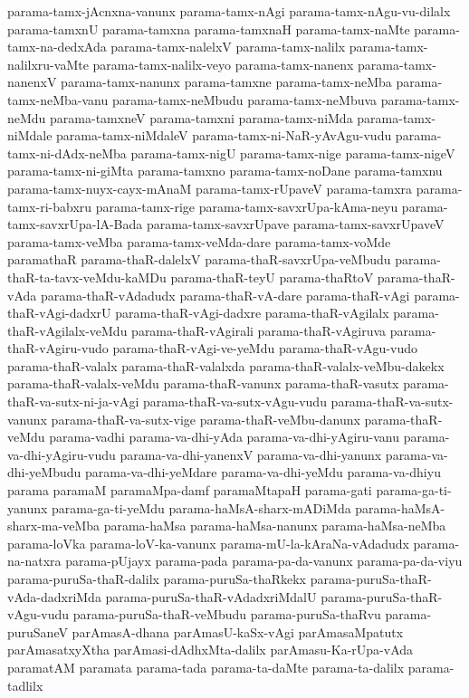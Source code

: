 {parama-tamx-jAcnxna-vanunx
parama-tamx-nAgi
parama-tamx-nAgu-vu-dilalx
parama-tamxnU
parama-tamxna
parama-tamxnaH
parama-tamx-naMte
parama-tamx-na-dedxAda
parama-tamx-nalelxV
parama-tamx-nalilx
parama-tamx-nalilxru-vaMte
parama-tamx-nalilx-veyo
parama-tamx-nanenx
parama-tamx-nanenxV
parama-tamx-nanunx
parama-tamxne
parama-tamx-neMba
parama-tamx-neMba-vanu
parama-tamx-neMbudu
parama-tamx-neMbuva
parama-tamx-neMdu
parama-tamxneV
parama-tamxni
parama-tamx-niMda
parama-tamx-niMdale
parama-tamx-niMdaleV
parama-tamx-ni-NaR-yAvAgu-vudu
parama-tamx-ni-dAdx-neMba
parama-tamx-nigU
parama-tamx-nige
parama-tamx-nigeV
parama-tamx-ni-giMta
parama-tamxno
parama-tamx-noDane
parama-tamxnu
parama-tamx-nuyx-cayx-mAnaM
parama-tamx-rUpaveV
parama-tamxra
parama-tamx-ri-babxru
parama-tamx-rige
parama-tamx-savxrUpa-kAma-neyu
parama-tamx-savxrUpa-lA-Bada
parama-tamx-savxrUpave
parama-tamx-savxrUpaveV
parama-tamx-veMba
parama-tamx-veMda-dare
parama-tamx-voMde
paramathaR
parama-thaR-dalelxV
parama-thaR-savxrUpa-veMbudu
parama-thaR-ta-tavx-veMdu-kaMDu
parama-thaR-teyU
parama-thaRtoV
parama-thaR-vAda
parama-thaR-vAdadudx
parama-thaR-vA-dare
parama-thaR-vAgi
parama-thaR-vAgi-dadxrU
parama-thaR-vAgi-dadxre
parama-thaR-vAgilalx
parama-thaR-vAgilalx-veMdu
parama-thaR-vAgirali
parama-thaR-vAgiruva
parama-thaR-vAgiru-vudo
parama-thaR-vAgi-ve-yeMdu
parama-thaR-vAgu-vudo
parama-thaR-valalx
parama-thaR-valalxda
parama-thaR-valalx-veMbu-dakekx
parama-thaR-valalx-veMdu
parama-thaR-vanunx
parama-thaR-vasutx
parama-thaR-va-sutx-ni-ja-vAgi
parama-thaR-va-sutx-vAgu-vudu
parama-thaR-va-sutx-vanunx
parama-thaR-va-sutx-vige
parama-thaR-veMbu-danunx
parama-thaR-veMdu
parama-vadhi
parama-va-dhi-yAda
parama-va-dhi-yAgiru-vanu
parama-va-dhi-yAgiru-vudu
parama-va-dhi-yanenxV
parama-va-dhi-yanunx
parama-va-dhi-yeMbudu
parama-va-dhi-yeMdare
parama-va-dhi-yeMdu
parama-va-dhiyu
parama
paramaM
paramaMpa-damf
paramaMtapaH
parama-gati
parama-ga-ti-yanunx
parama-ga-ti-yeMdu
parama-haMsA-sharx-mADiMda
parama-haMsA-sharx-ma-veMba
parama-haMsa
parama-haMsa-nanunx
parama-haMsa-neMba
parama-loVka
parama-loV-ka-vanunx
parama-mU-la-kAraNa-vAdadudx
parama-na-natxra
parama-pUjayx
parama-pada
parama-pa-da-vanunx
parama-pa-da-viyu
parama-puruSa-thaR-dalilx
parama-puruSa-thaRkekx
parama-puruSa-thaR-vAda-dadxriMda
parama-puruSa-thaR-vAdadxriMdalU
parama-puruSa-thaR-vAgu-vudu
parama-puruSa-thaR-veMbudu
parama-puruSa-thaRvu
parama-puruSaneV
parAmasA-dhana
parAmasU-kaSx-vAgi
parAmasaMpatutx
parAmasatxyXtha
parAmasi-dAdhxMta-dalilx
parAmasu-Ka-rUpa-vAda
paramatAM
paramata
parama-tada
parama-ta-daMte
parama-ta-dalilx
parama-tadlilx
}
